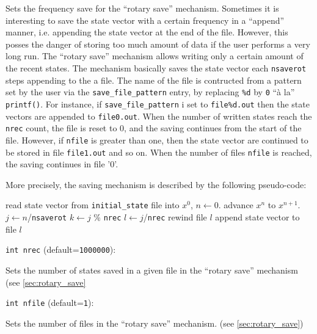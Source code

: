 Sets the frequency save for the ``rotary save'' mechanism. 
\label{sec:rotary_save}
Sometimes it is interesting to save the state vector with a certain
frequency in a ``append'' manner, i.e. appending the state vector at
the end of the file. However, this posses the danger of storing too
much amount of data if the user performs a very long run. The ``rotary
save'' mechanism allows writing only a certain amount of the recent
states. The mechanism basically saves the state vector each
\verb+nsaverot+ steps appending to the a file. The name of the file is
contructed from a pattern set by the user via the
\verb+save_file_pattern+ entry, by replacing \verb+%d+ 
by \verb+0+ ``\`a la'' \verb+printf()+. For instance, if
\verb+save_file_pattern+ i set to \verb+file%d.out+ 
then the state vectors are appended to \verb+file0.out+.  When the
number of written states reach the \verb+nrec+ count, the file is
reset to 0, and the saving continues from the start of the
file. However, if \verb+nfile+ is greater than one, then the state
vector are continued to be stored in file \verb+file1.out+ and so
on. When the number of files \verb+nfile+ is reached, the saving
continues in file '0'.

More precisely, the saving mechanism is described by the following
pseudo-code:

\begin{algorithmic}
\STATE read state vector from \verb+initial_state+ file into $x^0$, $n\gets 0$.
  \STATE advance $x^n$ to $x^{n+1}$.
    \STATE $j \gets n$/{\tt nsaverot}
    \STATE $k \gets j$ \% {\tt nrec}
    \STATE $l \gets j$/{\tt nrec}
    \STATE rewind file $l$ \ENDIF
    \STATE append state vector to file $l$
  \ENDIF
\ENDFOR
\end{algorithmic}

\item\verb+int nrec+ {\rm(default=\verb|1000000|)}:

Sets the number of states saved in a given file
in the ``rotary save'' mechanism (see \ref{sec:rotary_save}

\item\verb+int nfile+ {\rm(default=\verb|1|)}:

Sets the number of files in the ``rotary save'' mechanism. 
(see \ref{sec:rotary_save})

